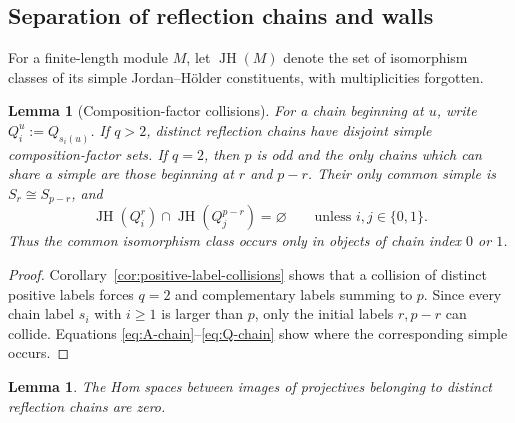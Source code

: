 \documentclass[12pt,leqno]{amsart}
\numberwithin{equation}{section}
\newtheorem{lem}[thm]{Lemma}
\begin{document}
\subsection{Separation of reflection chains and walls}

For a finite-length module $M$, let $\operatorname{JH}(M)$ denote the set
of isomorphism classes of its simple Jordan--H\"older constituents, with
multiplicities forgotten.

\begin{lem}[Composition-factor collisions]\label{lem:composition-collisions}
For a chain beginning at $u$, write $Q_i^u:=Q_{s_i(u)}$.  If $q>2$,
distinct reflection chains have disjoint simple
composition-factor sets.  If $q=2$, then $p$ is odd and the only chains
which can share a simple are those beginning at $r$ and $p-r$.  Their only
common simple is $S_r\cong S_{p-r}$, and
\[
 \operatorname{JH}(Q_i^r)\cap
 \operatorname{JH}(Q_j^{p-r})=\varnothing
 \qquad\text{unless }i,j\in\{0,1\}.
\]
Thus the common isomorphism class occurs only in objects of chain index
$0$ or $1$.
\end{lem}

\begin{proof}
Corollary~\ref{cor:positive-label-collisions} shows that a collision of
distinct positive labels forces $q=2$ and complementary labels summing to
$p$.  Since every chain label $s_i$ with $i\ge1$ is larger than $p$, only
the initial labels $r,p-r$ can collide.  Equations
\eqref{eq:A-chain}--\eqref{eq:Q-chain} show where the corresponding simple
occurs.
\end{proof}

\begin{lem}\label{lem:cross-chain}
The Hom spaces between images of projectives belonging to distinct reflection
chains are zero.
\end{lem}
\end{document}
